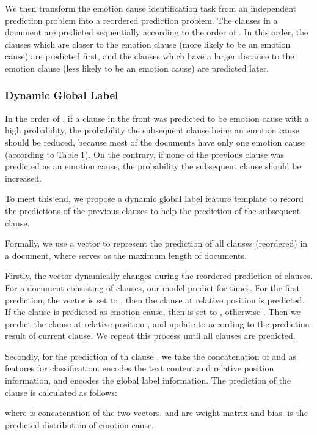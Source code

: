 \documentclass[letterpaper]{article} \usepackage{aaai19}  \usepackage{times}  \usepackage{helvet}  \usepackage{courier}  \usepackage{url}  \usepackage{graphicx}  \frenchspacing  \setlength{\pdfpagewidth}{8.5in}  \setlength{\pdfpageheight}{11in}  \setcounter{secnumdepth}{0}
\begin{document}
We then transform the emotion cause identification task from an independent prediction problem into a reordered prediction problem. The clauses in a document are predicted sequentially according to the order of . In this order, the clauses which are closer to the emotion clause (more likely to be an emotion cause) are predicted first, and the clauses which have a larger distance to the emotion clause (less likely to be an emotion cause) are predicted later.

\subsubsection{Dynamic Global Label}

In the order of , if a clause in the front was predicted to be emotion cause with a high probability, the probability the subsequent clause being an emotion cause should be reduced, because most of the documents have only one emotion cause (according to Table 1). On the contrary, if none of the previous clause was predicted as an emotion cause, the probability the subsequent clause should be increased.

To meet this end, we propose a dynamic global label feature template to record the predictions of the previous clauses to help the prediction of the subsequent clause.

Formally, we use a vector  to represent the prediction of all clauses (reordered) in a document, where  serves as the maximum length of documents.

Firstly, the vector  dynamically changes during the reordered prediction of clauses. For a document consisting of  clauses, our model predict for  times. For the first prediction, the vector  is set to , then the clause at relative position  is predicted. If the clause is predicted as emotion cause, then  is set to , otherwise . Then we predict the clause at relative position , and update  to  according to the prediction result of current clause. We repeat this process until all clauses are predicted.

Secondly, for the prediction of th clause , we take the concatenation of  and  as features for classification.  encodes the text content and relative position information, and  encodes the global label information. The prediction of the clause is calculated as follows:

where  is concatenation of the two vectors.  and  are weight matrix and bias.  is the predicted distribution of emotion cause.
\end{document}
